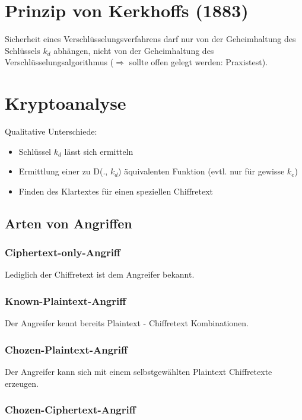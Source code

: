 \section{Prinzip von Kerkhoffs (1883)}

Sicherheit eines Verschlüsselungsverfahrens darf nur von der Geheimhaltung des Schlüssels $k_d$ abhängen, nicht von der Geheimhaltung des Verschlüsselungsalgorithmus ($\Rightarrow$ sollte offen gelegt werden: Praxistest).

\section{Kryptoanalyse}

Qualitative Unterschiede: 

\begin{itemize}
  \item Schlüssel $k_d$ lässt sich ermitteln
  \item Ermittlung einer zu D(., $k_d$) äquivalenten Funktion (evtl. nur für gewisse $k_e$)
  \item Finden des Klartextes für einen speziellen Chiffretext
\end{itemize}

\subsection{Arten von Angriffen}

\subsubsection{Ciphertext-only-Angriff}

Lediglich der Chiffretext ist dem Angreifer bekannt.

\subsubsection{Known-Plaintext-Angriff}

Der Angreifer kennt bereits Plaintext - Chiffretext Kombinationen.

\subsubsection{Chozen-Plaintext-Angriff}

Der Angreifer kann sich mit einem selbstgewählten Plaintext Chiffretexte erzeugen.

\subsubsection{Chozen-Ciphertext-Angriff}

